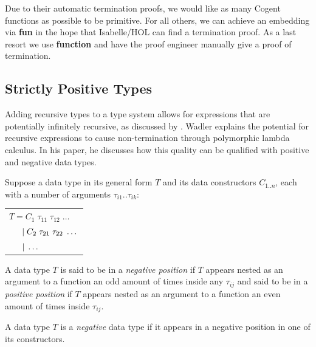 Due to their automatic termination proofs, we would like as many Cogent functions as possible to be
primitive. For all others, we can achieve an embedding via \textbf{fun} in the hope that Isabelle/HOL can find
a termination proof. As a last resort we use \textbf{function} and have the proof engineer 
manually give a proof of termination. 

\subsection{Strictly Positive Types}

Adding recursive types to a type system allows for expressions that are potentially infinitely recursive,
as discussed by \citet{RecursiveTypesForFree}. Wadler explains the potential for recursive expressions
to cause non-termination through polymorphic lambda calculus. In his paper, he discusses how this
quality can be qualified with positive and negative data types.

Suppose a data type in its general form $T$ and its data constructors $C_{1..n}$, each with a number of arguments 
$\tau_{i1}..\tau_{ik}$:

\begin{center}
    \begin{tabular}{l}
        $T = C_1\; \tau_{11} \; \tau_{12} \; \dots$ \\
        $\hspace{1.5em} \vert\; C_2\; \tau_{21} \; \tau_{22} \; \dots$ \\
        $\hspace{1.5em} \vert\; \dots$ \\
    \end{tabular} 
\end{center}

\theoremstyle{definition}
\begin{definition}
    A data type $T$ is said to be in a \textit{negative position} if $T$ appears nested as an argument
    to a function an odd amount of times inside any $\tau_{ij}$ and said to be in a \textit{positive position}
    if $T$ appears nested as an argument to a function an even amount of times inside $\tau_{ij}$.
\end{definition}

\theoremstyle{definition}
\begin{definition}
    A data type $T$ is a \textit{negative} data type if it appears in a negative position 
    in one of its constructors.
\end{definition}

